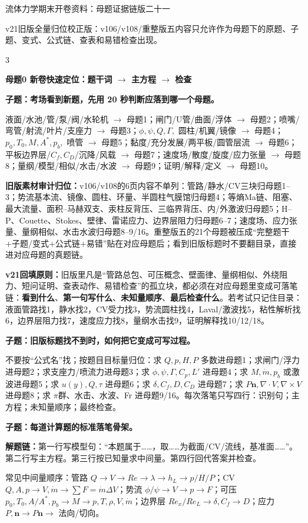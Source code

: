 \documentclass[a4paper]{article}
\newcommand{\mt}[1]{\vspace{0.12pt}\colorbox{M}{\parbox{\dimexpr\linewidth-2\fboxsep}{\color{white}\bfseries #1}}\par}
\newcommand{\qt}[1]{\vspace{0.04pt}\colorbox{Q}{\parbox{\dimexpr\linewidth-2\fboxsep}{\color{white}\bfseries #1}}\par}
\newcommand{\ans}[1]{\colorbox{G}{\parbox{\dimexpr\linewidth-2\fboxsep}{#1}}\par}
\newcommand{\chain}[1]{{\color{A}\bfseries 解题链：}#1\par}
\begin{document}
\fontsize{2.86}{2.98}\selectfont
\begin{center}
{\heiti\fontsize{6.1}{6.35}\selectfont 流体力学期末开卷资料：母题证据链版二十一}\par
{\fontsize{3.18}{3.34}\selectfont v21旧版全量归位校正版：v106/v108/重整版五内容只允许作为母题下的原题、子题、变式、公式链、查表和易错检查出现。}
\end{center}
\vspace{-3.4pt}
\begin{multicols}{3}

\mt{母题0 新卷快速定位：题干词 $\to$ 主方程 $\to$ 检查}
\qt{子题：考场看到新题，先用 20 秒判断应落到哪一个母题。}
\ans{液面/水池/管/泵/阀/水轮机 $\to$ 母题1；闸门/U管/曲面/浮体 $\to$ 母题2；喷嘴/弯管/射流/叶片/支座力 $\to$ 母题3；$\phi,\psi,Q,\Gamma,$ 圆柱/机翼/镜像 $\to$ 母题4；$p_0,T_0,M,A^*,p_b,$ 喷管 $\to$ 母题5；黏度/充分发展/两平板/圆管层流 $\to$ 母题6；平板边界层/$C_f,C_D$/沉降/风载 $\to$ 母题7；速度场/散度/旋度/应力张量 $\to$ 母题8；量纲/模型/相似/水击/水波 $\to$ 母题9；证明/解释/定义 $\to$ 母题10。}
\ans{\textbf{旧版素材审计归位：}v106/v108的6页内容不单列：管路/静水/CV三块归母题1--3；势流基本流、镜像、圆柱、环量、半圆柱气膜馆归母题4；等熵Ma链、阻塞、最大流量、面积--马赫双支、汞柱反背压、三临界背压、内/外激波归母题5；H--P、Couette、Stokes、壁律、雷诺应力、边界层阻力归母题6--7；速度场、应力张量、量纲相似、水击水波归母题8--9/16。重整版五的21个母题被压成“完整题干+子题/变式+公式链+易错”贴在对应母题后；看到旧版标题时不要翻目录，直接进对应母题的真题链。}
\ans{\textbf{v21回填原则：}旧版里凡是“管路总包、可压概念、壁面律、量纲相似、外绕阻力、短问证明、查表动作、易错检查”的孤立块，都必须在对应母题里变成可落笔链：\textbf{看到什么}、\textbf{第一句写什么}、\textbf{未知量顺序}、\textbf{最后检查什么}。若考试只记住目录：液面管路找1，静水找2，CV受力找3，势流圆柱找4，Laval/激波找5，粘性解析找6，边界层阻力找7，速度应力找8，量纲水击找9，证明解释找10/12/18。}
\qt{子题：旧版标题找不到时，如何把它变成可写过程。}
\ans{不要按“公式名”找；按题目目标量归位：求 $Q,p,H,P$ 多数进母题1；求闸门/浮力进母题2；求支座力/喷流力进母题3；求 $\phi,\psi,\Gamma,C_p,L'$ 进母题4；求 $M,\dot m,p_b$ 或激波进母题5；求 $u(y),Q,\tau$ 进母题6；求 $\delta,C_f,D,C_D$ 进母题7；求 $P\bm n,\nabla\cdot V,\nabla\times V$ 进母题8；求 $\pi$群、水击、水波、Fr 进母题9/16。每次落笔只写四行：识别句；主方程；未知量顺序；最终检查。}
\qt{子题：每道计算题的标准落笔骨架。}
\chain{第一行写模型句：“本题属于……，取……为截面/CV/流线，基准面……”。第二行写主方程。第三行按已知量求中间量。第四行回代答案并检查。}
\ans{常见中间量顺序：管路 $Q\to V\to Re\to\lambda\to h_L\to p/H/P$；CV $Q,A,p\to V,\dot m\to \sum F=\dot m\Delta V$；势流 $\phi/\psi\to V\to p\to F$；可压 $p_0,T_0,A/A^*,p_b\to M\to p,T,\rho,V,\dot m$；边界层 $Re_x/Re_L\to\delta,C_f\to D$；应力 $P,\bm n\to P\bm n\to$ 法向/切向。}

\end{multicols}
\end{document}
